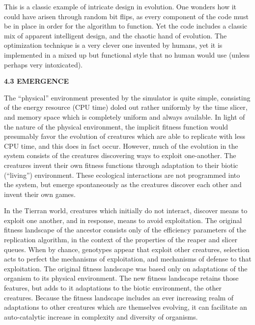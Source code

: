 This is a classic example of intricate design in evolution.  One wonders how
it could have arisen through random bit flips, as every component of the code
must be in place in order for the algorithm to function.  Yet the code
includes a classic mix of apparent intelligent design, and the chaotic hand
of evolution.  The optimization technique is a very clever one invented by
humans, yet it is implemented in a mixed up but functional style that no human
would use (unless perhaps very intoxicated).

\LP
\bf 4.3 EMERGENCE\rm
\eLP

The ``physical'' environment presented by the simulator is quite simple,
consisting of the energy resource (CPU time) doled out rather uniformly by
the time slicer, and memory space which is completely uniform and always
available.  In light of the nature of the physical environment, the implicit
fitness function would presumably favor the evolution of creatures which are
able to replicate with less CPU time, and this does in fact occur.  However,
much of the evolution in the system consists of the creatures discovering ways
to exploit one-another.  The creatures invent their own fitness functions
through adaptation to their biotic (``living'') environment.  These ecological
interactions are not programmed into the system, but emerge spontaneously as
the creatures discover each other and invent their own games.

In the Tierran world, creatures which initially
do not interact, discover means to exploit one another, and in response, means
to avoid exploitation.  The original fitness landscape of the ancestor
consists only of the efficiency parameters of the replication algorithm, in
the context of the properties of the reaper and slicer queues.  When by
chance, genotypes appear that exploit other creatures, selection acts to
perfect the mechanisms of exploitation, and mechanisms of defense to that
exploitation.  The original fitness landscape was based only on adaptations
of the organism to its physical environment.  The
new fitness landscape retains those features, but adds to it adaptations to
the biotic environment, the other creatures.  Because the fitness landscape
includes an ever increasing realm of adaptations to other creatures which
are themselves evolving, it can facilitate an auto-catalytic increase in
complexity and diversity of organisms.

